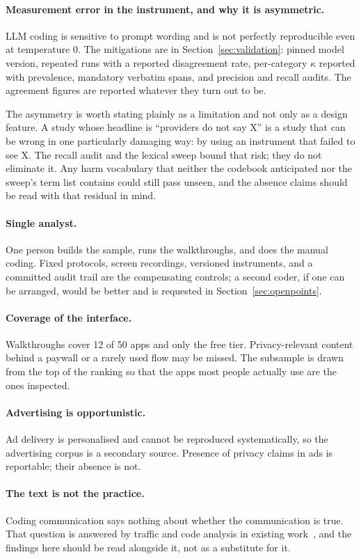 \paragraph{Measurement error in the instrument, and why it is asymmetric.}
LLM coding is sensitive to prompt wording and is not perfectly reproducible even
at temperature 0. The mitigations are in Section~\ref{sec:validation}: pinned
model version, repeated runs with a reported disagreement rate, per-category
$\kappa$ reported with prevalence, mandatory verbatim spans, and precision and
recall audits. The agreement figures are reported whatever they turn out to be.

The asymmetry is worth stating plainly as a limitation and not only as a design
feature. A study whose headline is \enquote{providers do not say X} is a study
that can be wrong in one particularly damaging way: by using an instrument that
failed to see X. The recall audit and the lexical sweep bound that risk; they do
not eliminate it. Any harm vocabulary that neither the codebook anticipated nor
the sweep's term list contains could still pass unseen, and the absence claims
should be read with that residual in mind.

\paragraph{Single analyst.}
One person builds the sample, runs the walkthroughs, and does the manual coding.
Fixed protocols, screen recordings, versioned instruments, and a committed audit
trail are the compensating controls; a second coder, if one can be arranged,
would be better and is requested in Section~\ref{sec:openpoints}.

\paragraph{Coverage of the interface.}
Walkthroughs cover 12 of 50 apps and only the free tier. Privacy-relevant
content behind a paywall or a rarely used flow may be missed. The subsample is
drawn from the top of the ranking so that the apps most people actually use are
the ones inspected.

\paragraph{Advertising is opportunistic.}
Ad delivery is personalised and cannot be reproduced systematically, so the
advertising corpus is a secondary source. Presence of privacy claims in ads is
reportable; their absence is not.

\paragraph{The text is not the practice.}
Coding communication says nothing about whether the communication is true.
That question is answered by traffic and code analysis in existing
work~\parencite{arkalakis2024abandon,hudig2025intimate,huckvale2019assessment},
and the findings here should be read alongside it, not as a substitute for it.
